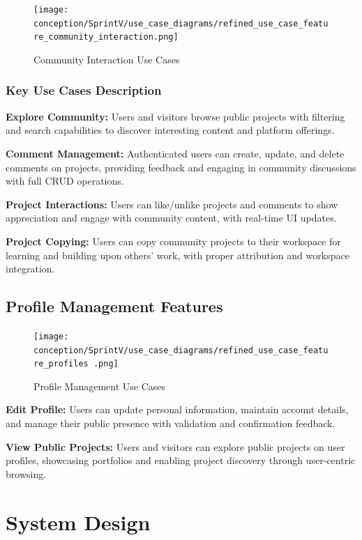 \begin{figure}[H]
\centering
\texttt{[image: conception/SprintV/use\_case\_diagrams/refined\_use\_case\_feature\_community\_interaction.png]}
\caption{Community Interaction Use Cases}
\label{fig:community_interaction_use_case}
\end{figure}

\subsubsection{Key Use Cases Description}

\textbf{Explore Community:} Users and visitors browse public projects with filtering and search capabilities to discover interesting content and platform offerings.

\textbf{Comment Management:} Authenticated users can create, update, and delete comments on projects, providing feedback and engaging in community discussions with full CRUD operations.

\textbf{Project Interactions:} Users can like/unlike projects and comments to show appreciation and engage with community content, with real-time UI updates.

\textbf{Project Copying:} Users can copy community projects to their workspace for learning and building upon others' work, with proper attribution and workspace integration.

\subsection{Profile Management Features}

\begin{figure}[H]
\centering
\texttt{[image: conception/SprintV/use\_case\_diagrams/refined\_use\_case\_feature\_profiles .png]}
\caption{Profile Management Use Cases}
\label{fig:profile_management_use_case}
\end{figure}

\textbf{Edit Profile:} Users can update personal information, maintain account details, and manage their public presence with validation and confirmation feedback.

\textbf{View Public Projects:} Users and visitors can explore public projects on user profiles, showcasing portfolios and enabling project discovery through user-centric browsing.

\section{System Design}

